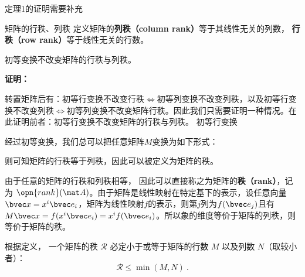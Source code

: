 
\begin{issues}
\issueDraft 定理1的证明需要补充
\end{issues}


\begin{definition}{矩阵的行秩、列秩}
定义矩阵的\textbf{列秩（column rank）}等于其线性无关的列数， \textbf{行秩（row rank）}等于线性无关的行数。
\end{definition}
\begin{theorem}{}
初等变换不改变矩阵的行秩与列秩。
\end{theorem}
\textbf{证明：}

转置矩阵后有：初等行变换不改变行秩$\Leftrightarrow$初等列变换不改变列秩，以及初等行变换不改变列秩$\Leftrightarrow$初等列变换不改变矩阵行秩。因此我们只需要证明一种情况。在此证明前者：初等行变换不改变矩阵的行秩与列秩。
初等行变换


经过初等变换，我们总可以把任意矩阵$M$变换为如下形式：


则可知矩阵的行秩等于列秩，因此可以被定义为矩阵的秩。

\begin{definition}{}
由于任意的矩阵的行秩和列秩相等， 因此可以直接称之为矩阵的\textbf{秩（rank）}，记为 $\opn{rank}(\mat A)$。由于矩阵是线性映射在特定基下的表示，设任意向量$\bvec x=x^i\bvec e_i$，矩阵为线性映射$f$的表示，则第$j$列为$f(\bvec e_j)$且有$M\bvec x=f(x^i\bvec  e_i)=x^if(\bvec e_i)$。所以象的维度等价于矩阵的列秩，则等价于矩阵的秩。
\end{definition}




\begin{theorem}{}
根据定义， 一个矩阵的秩 $\mathcal R$ 必定小于或等于矩阵的行数 $M$ 以及列数 $N$（取较小者）：
\begin{equation}
\mathcal R\leq \min (M, N)~.
\end{equation}
\end{theorem}

